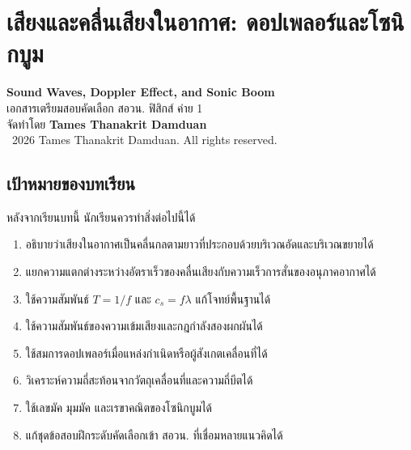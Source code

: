 %

\chapter{เสียงและคลื่นเสียงในอากาศ: ดอปเพลอร์และโซนิกบูม}

\begin{center}
    {\Large \textbf{Sound Waves, Doppler Effect, and Sonic Boom}}\\[4pt]
    {\normalsize เอกสารเตรียมสอบคัดเลือก สอวน. ฟิสิกส์ ค่าย 1}\\[6pt]
    {\normalsize จัดทำโดย \textbf{Tames Thanakrit Damduan}}\\[2pt]
    {\footnotesize \textcopyright\ 2026 Tames Thanakrit Damduan. All rights reserved.}\\[8pt]
\end{center}

\sloppy

\section*{เป้าหมายของบทเรียน}

หลังจากเรียนบทนี้ นักเรียนควรทำสิ่งต่อไปนี้ได้

\begin{enumerate}
    \item อธิบายว่าเสียงในอากาศเป็นคลื่นกลตามยาวที่ประกอบด้วยบริเวณอัดและบริเวณขยายได้
    \item แยกความแตกต่างระหว่างอัตราเร็วของคลื่นเสียงกับความเร็วการสั่นของอนุภาคอากาศได้
    \item ใช้ความสัมพันธ์ $T=1/f$ และ $c_s=f\lambda$ แก้โจทย์พื้นฐานได้
    \item ใช้ความสัมพันธ์ของความเข้มเสียงและกฎกำลังสองผกผันได้
    \item ใช้สมการดอปเพลอร์เมื่อแหล่งกำเนิดหรือผู้สังเกตเคลื่อนที่ได้
    \item วิเคราะห์ความถี่สะท้อนจากวัตถุเคลื่อนที่และความถี่บีตได้
    \item ใช้เลขมัค มุมมัค และเรขาคณิตของโซนิกบูมได้
    \item แก้ชุดข้อสอบฝึกระดับคัดเลือกเข้า สอวน. ที่เชื่อมหลายแนวคิดได้
\end{enumerate}

